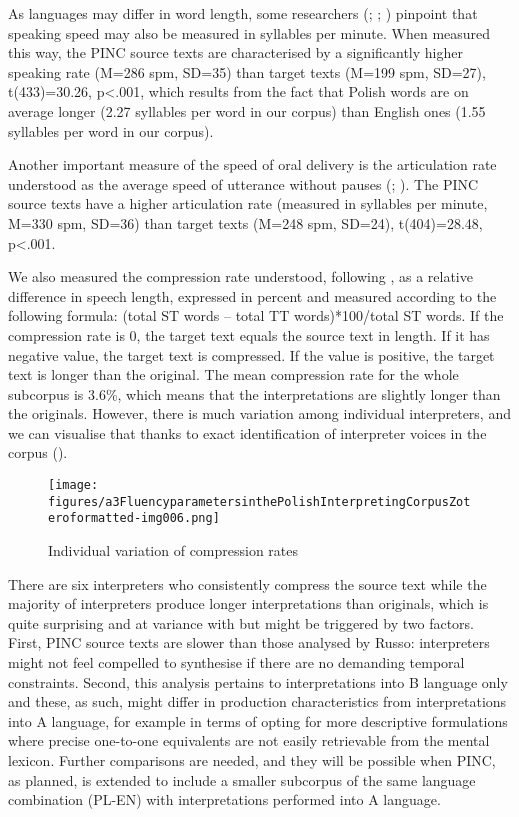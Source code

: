 \documentclass[output=paper]{langscibook}
\begin{document}
As languages may differ in word length, some researchers (\citealt{Riccardi2015}; \citealt{Seeber2017}; \citealt{Tissi2000}) pinpoint that speaking speed may also be measured in syllables per minute. When measured this way, the PINC source texts are characterised by a significantly higher speaking rate (M=286 spm, SD=35) than target texts (M=199 spm, SD=27), t(433)=30.26, p<.001, which results from the fact that Polish words are on average longer (2.27 syllables per word in our corpus) than English ones (1.55 syllables per word in our corpus). 

Another important measure of the speed of oral delivery is the articulation rate understood as the average speed of utterance without pauses (\citealt{Christodoulides2013}; \citealt{Riccardi2015}). The PINC source texts have a higher articulation rate (measured in syllables per minute, M=330 spm, SD=36) than target texts (M=248 spm, SD=24), t(404)=28.48, p<.001.

We also measured the compression rate understood, following \citet{Russo2018}, as a relative difference in speech length, expressed in percent and measured according to the following formula: (total ST words – total TT words)*100/total ST words. If the compression rate is 0, the target text equals the source text in length. If it has negative value, the target text is compressed. If the value is positive, the target text is longer than the original. The mean compression rate for the whole subcorpus is 3.6\%, which means that the interpretations are slightly longer than the originals. However, there is much variation among individual interpreters, and we can visualise that thanks to exact identification of interpreter voices in the corpus ().

   
 \begin{figure}
\texttt{[image: figures/a3FluencyparametersinthePolishInterpretingCorpusZoteroformatted-img006.png]}
 

\caption{
Individual variation of compression rates 
}
\label{fig:chmiel:6}
\end{figure}

There are six interpreters who consistently compress the source text while the majority of interpreters produce longer interpretations than originals, which is quite surprising and at variance with \citet{Russo2018} but might be triggered by two factors. First, PINC source texts are slower than those analysed by Russo: interpreters might not feel compelled to synthesise if there are no demanding temporal constraints. Second, this analysis pertains to interpretations into B language only and these, as such, might differ in production characteristics from interpretations into A language, for example in terms of opting for more descriptive formulations where precise one-to-one equivalents are not easily retrievable from the mental lexicon. Further comparisons are needed, and they will be possible when PINC, as planned, is extended to include a smaller subcorpus of the same language combination (PL-EN) with interpretations performed into A language. 
\end{document}
